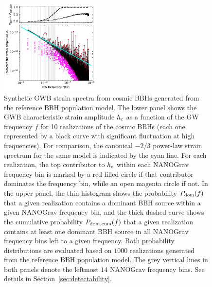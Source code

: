 \documentclass[twocolumn]{aastex631}
\newcommand{\rmc}{_{\rm c}}
\begin{document}
\begin{figure} 
%
\centering
%
\includegraphics[width=0.45\textwidth]{f2.pdf}
%
\caption{Synthetic GWB strain spectra from cosmic BBHs generated from the
reference BBH population model. The lower panel shows the GWB characteristic
strain amplitude $h\rmc$ as a function of the GW frequency $f$ for 10
realizations of the cosmic BBHs (each one represented by a black curve with
significant fluctuation at high frequencies). For comparison, the canonical
$-2/3$ power-law strain spectrum for the same model is indicated by the cyan
line. For each realization, the top contributor to $h\rmc$ within each NANOGrav
frequency bin is marked by a red filled circle if that contributor dominates the
frequency bin, while an open magenta circle if not. In the upper panel, the thin
histogram shows the probability $P_{\rm dom}(f)$ that a given realization
contains a dominant BBH source within a given NANOGrav frequency bin, and the
thick dashed curve shows the cumulative probability $P_{\rm dom,cum}(f)$ that a
given realization contains at least one dominant BBH source in all NANOGrav
frequency bins left to a given frequency. Both probability distributions are
evaluated based on $1000$ realizations generated from the reference BBH
population model. The grey vertical lines in both panels denote the leftmost
$14$ NANOGrav frequency bins. See details in Section~\ref{sec:detectability}.}
%
\label{fig:GWBSynthesisHigh}
%
\end{figure}
\end{document}
